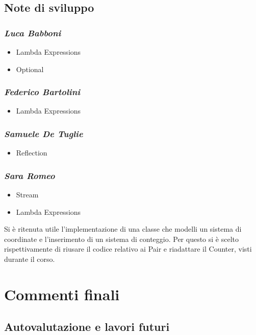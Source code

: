 \documentclass[a4paper,titlepage,12pt]{article}
\begin{document}
\subsection{Note di sviluppo}
\subsubsection*{\large \slshape Luca Babboni}
\begin{itemize}
    \item[\ding{223}] Lambda Expressions
    \item[\ding{223}] Optional
\end{itemize}

\subsubsection*{\large \slshape Federico Bartolini}
\begin{itemize}
    \item[\ding{223}] Lambda Expressions
\end{itemize}

\subsubsection*{\large \slshape Samuele De Tuglie}
\begin{itemize}
    \item[\ding{223}] Reflection
\end{itemize}

\subsubsection*{\large \slshape Sara Romeo}
\begin{itemize}
    \item[\ding{223}] Stream
    \item[\ding{223}] Lambda Expressions
\end{itemize}
Si è ritenuta utile l'implementazione di una classe che modelli un sistema di coordinate e l'inserimento di un sistema di conteggio. Per questo si è scelto rispettivamente di riusare il codice relativo ai Pair e riadattare il Counter, visti durante il corso.

\newpage
\section{Commenti finali}
\subsection{Autovalutazione e lavori futuri}
\end{document}
